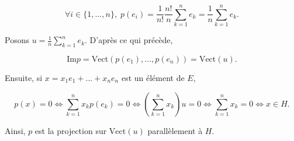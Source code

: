 {{$$\forall i\in\{1,...,n\},\;p(e_i)=\frac{1}{n!}\frac{n!}{n}\sum_{k=1}^{n}e_k=\frac{1}{n}\sum_{k=1}^{n}e_k.$$

Posons $u=\frac{1}{n}\sum_{k=1}^{n}e_k$. D'après ce qui précède,

$$\mbox{Im}p=\mbox{Vect}(p(e_1),...,p(e_n))=\mbox{Vect}(u).$$

Ensuite, si $x=x_1e_1+...+x_ne_n$ est un élément de $E$,

$$p(x)=0\Leftrightarrow\sum_{k=1}^{n}x_kp(e_k)=0\Leftrightarrow(\sum_{k=1}^{n}x_k)u=0\Leftrightarrow\sum_{k=1}^{n}x_k=0\Leftrightarrow x\in H.$$

Ainsi, $p$ est la projection sur $\mbox{Vect}(u)$ parallèlement à $H$.
}
}
